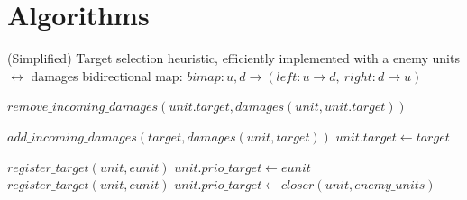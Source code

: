 %
%
%



\section{Algorithms}

\begin{algorithm}
\caption{(Simplified) Target selection heuristic, efficiently implemented with a enemy units $\leftrightarrow$ damages bidirectional map: $bimap : u, d \rightarrow (left : u \rightarrow d,\ right : d \rightarrow u)$}
\label{alg:targetselection}
\begin{algorithmic}
\State $remove\_incoming\_damages(unit.target, damages(unit,unit.target))$
\EndFunction

\State $add\_incoming\_damages(target, damages(unit, target))$
\State $unit.target \leftarrow target$
\EndFunction

            \State $register\_target(unit, eunit)$
            \State $unit.prio\_target \leftarrow eunit$
        \EndIf 
    \EndIf 
\EndFor
{}
            \State $register\_target(unit, eunit)$
        \EndIf 
    \EndFor
\EndIf
{} %
    $unit.prio\_target \leftarrow closer(unit, enemy\_units)$
\EndIf
\EndFunction
\end{algorithmic}
\end{algorithm}

